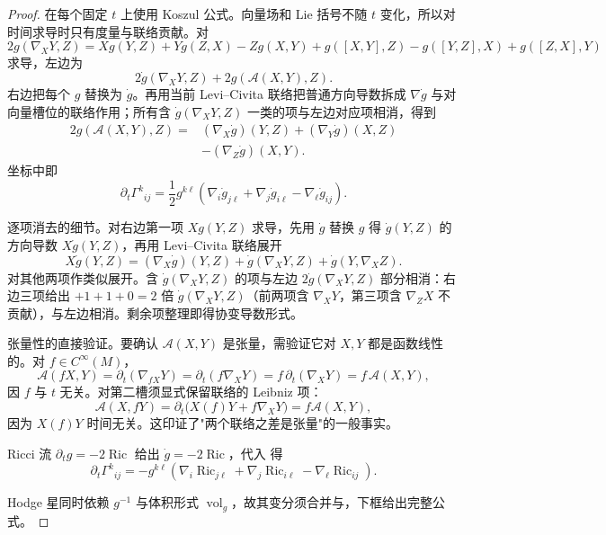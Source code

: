 \begin{proof}
在每个固定 $t$ 上使用 Koszul 公式。向量场和 Lie 括号不随 $t$ 变化，所以对时间求导时只有度量与联络贡献。对
\[
2g(\nabla_XY,Z)
=Xg(Y,Z)+Yg(Z,X)-Zg(X,Y)
+g([X,Y],Z)-g([Y,Z],X)+g([Z,X],Y)
\]
求导，左边为
\[
2\dot g(\nabla_XY,Z)+2g(\mathcal A(X,Y),Z).
\]
右边把每个 $g$ 替换为 $\dot g$。再用当前 Levi--Civita 联络把普通方向导数拆成 $\nabla \dot g$ 与对向量槽位的联络作用；所有含 $\dot g(\nabla_XY,Z)$ 一类的项与左边对应项相消，得到
\begin{equation}\label{eq:math-dg-connection-variation}
{
\begin{aligned}
2g(\mathcal A(X,Y),Z)
={}&(\nabla_X\dot g)(Y,Z)
+(\nabla_Y\dot g)(X,Z)\\
&-(\nabla_Z\dot g)(X,Y).
\end{aligned}}
\end{equation}
坐标中即
\begin{equation}\label{eq:math-dg-christoffel-variation}
{
\partial_t\Gamma^k{}_{ij}
=\frac12g^{k\ell}
\left(
\nabla_i \dot g_{j\ell}
+\nabla_j \dot g_{i\ell}
-\nabla_\ell \dot g_{ij}
\right).}
\end{equation}

逐项消去的细节。对右边第一项 $Xg(Y,Z)$ 求导，先用 $\dot g$ 替换 $g$ 得 $\dot g(Y,Z)$ 的方向导数 $X\dot g(Y,Z)$，再用 Levi--Civita 联络展开
\begin{equation*}
X\dot g(Y,Z)
=(\nabla_X\dot g)(Y,Z)
+\dot g(\nabla_XY,Z)+\dot g(Y,\nabla_XZ).
\end{equation*}
对其他两项作类似展开。含 $\dot g(\nabla_XY,Z)$ 的项与左边 $2\dot g(\nabla_XY,Z)$ 部分相消：右边三项给出 $+1+1+0=2$ 倍 $\dot g(\nabla_XY,Z)$（前两项含 $\nabla_XY$，第三项含 $\nabla_ZX$ 不贡献），与左边相消。剩余项整理即得协变导数形式。

张量性的直接验证。要确认 $\mathcal A(X,Y)$ 是张量，需验证它对 $X,Y$ 都是函数线性的。对 $f\in C^\infty(M)$，
\begin{equation*}
\mathcal A(fX,Y)=\partial_t(\nabla_{fX}Y)=\partial_t(f\nabla_XY)=f\,\partial_t(\nabla_XY)=f\,\mathcal A(X,Y),
\end{equation*}
因 $f$ 与 $t$ 无关。对第二槽须显式保留联络的 Leibniz 项：
\[
\mathcal A(X,fY)=\partial_t\bigl(X(f)Y+f\nabla_XY\bigr)
=f\mathcal A(X,Y),
\]
因为 $X(f)Y$ 时间无关。这印证了"两个联络之差是张量"的一般事实。

Ricci 流 $\partial_tg=-2\operatorname{Ric}$ 给出 $\dot g=-2\operatorname{Ric}$，代入 得
\begin{equation*}
\partial_t\Gamma^k{}_{ij}
=-g^{k\ell}\left(
\nabla_i\operatorname{Ric}_{j\ell}
+\nabla_j\operatorname{Ric}_{i\ell}
-\nabla_\ell\operatorname{Ric}_{ij}
\right).
\end{equation*}

Hodge 星同时依赖 $g^{-1}$ 与体积形式 $\operatorname{vol}_g$，故其变分须合并与，下框给出完整公式。
\end{proof}

